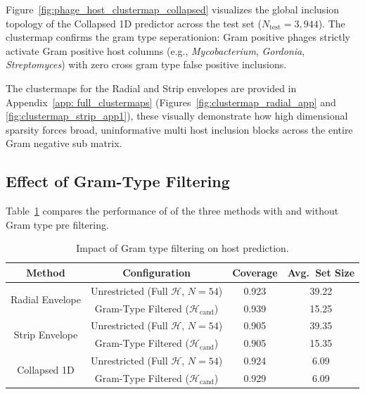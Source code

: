 Figure~\ref{fig:phage_host_clustermap_collapsed} visualizes the global inclusion topology of the Collapsed 1D predictor across the 
test set ($N_{\text{test}} = 3{,}944$). 
The clustermap confirms the gram type seperationion: Gram positive phages strictly activate Gram positive host columns 
(e.g., \textit{Mycobacterium}, \textit{Gordonia}, \textit{Streptomyces}) with zero cross gram type false positive inclusions.

The clustermaps for the Radial and Strip envelopes are provided in Appendix~\ref{app: full_clustermaps} 
(Figures~\ref{fig:clustermap_radial_app} and \ref{fig:clustermap_strip_app1}), these visually demonstrate how high dimensional 
sparsity forces broad, uninformative multi host inclusion blocks across the entire Gram negative sub matrix.



\subsection{Effect of Gram-Type Filtering}
\label{sec5.3.5: gram filtering effect}

Table~\ref{tab: gram filtering effect} compares the performance of of the three methods with and without Gram type pre 
filtering.

\begin{table}[htbp]
\centering
\begin{tabular}{cccc}
\toprule
\textbf{Method} & \textbf{Configuration} & \textbf{Coverage} & \textbf{Avg.\ Set Size} \\
\midrule
\multirow{2}{*}{Radial Envelope} &  Unrestricted (Full $\mathcal{H}$, $N=54$)         & 0.923  &  39.22  \\
                                 &  Gram-Type Filtered ($\mathcal{H}_{\text{cand}}$)  & 0.939  &  15.25  \\
\multirow{2}{*}{Strip Envelope}  &  Unrestricted (Full $\mathcal{H}$, $N=54$)         & 0.905  &  39.35  \\
                                 &  Gram-Type Filtered ($\mathcal{H}_{\text{cand}}$)  & 0.905  &  15.35  \\
\multirow{2}{*}{Collapsed 1D}    &  Unrestricted (Full $\mathcal{H}$, $N=54$)         & 0.924  &  6.09  \\
                                 &  Gram-Type Filtered ($\mathcal{H}_{\text{cand}}$)  & 0.929  &  6.09  \\
\bottomrule
\end{tabular}
\caption{Impact of Gram type filtering on host prediction.}
\label{tab: gram filtering effect}
\end{table}

